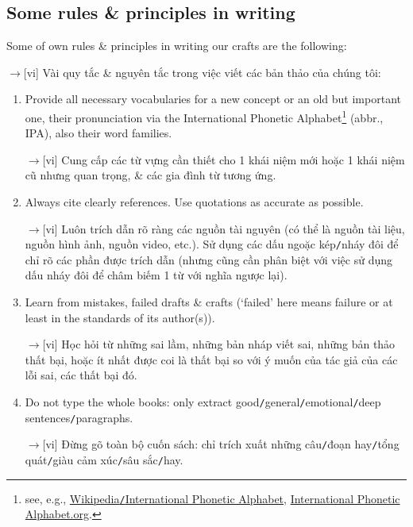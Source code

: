 \documentclass[12pt,twoside]{book}
\begin{document}
\subsection{Some rules \& principles in writing}
Some of own rules \& principles in writing our crafts are the following:

{\sf[en]$\to$[vi]} Vài quy tắc \& nguyên tắc trong việc viết các bản thảo của chúng tôi:
\begin{enumerate}
	\item Provide all necessary vocabularies for a new concept or an old but important one, their pronunciation via the International Phonetic Alphabet\footnote{see, e.g., \href{https://en.wikipedia.org/wiki/International_Phonetic_Alphabet}{Wikipedia{\tt/}International Phonetic Alphabet}, \href{https://www.internationalphoneticalphabet.org/}{International Phonetic Alphabet.org}.} (abbr., IPA), also their word families.
	
	{\sf[en]$\to$[vi]} Cung cấp các từ vựng cần thiết cho 1 khái niệm mới hoặc 1 khái niệm cũ nhưng quan trọng, \& các gia đình từ tương ứng.
	\item Always cite clearly references. Use quotations as accurate as possible.
	
	{\sf[en]$\to$[vi]} Luôn trích dẫn rõ ràng các nguồn tài nguyên (có thể là nguồn tài liệu, nguồn hình ảnh, nguồn video, etc.). Sử dụng các dấu ngoặc kép{\tt/}nháy đôi để chỉ rõ các phần được trích dẫn (nhưng cũng cần phân biệt với việc sử dụng dấu nháy đôi để châm biếm 1 từ với nghĩa ngược lại).
	\item Learn from mistakes, failed drafts \& crafts (`failed' here means failure or at least in the standards of its author(s)).
	
	{\sf[en]$\to$[vi]} Học hỏi từ những sai lầm, những bản nháp viết sai, những bản thảo thất bại, hoặc ít nhất được coi là thất bại so với ý muốn của tác giả của các lỗi sai, các thất bại đó.
	\item Do not type the whole books: only extract good{\tt/}general{\tt/}emotional{\tt/}deep sentences{\tt/}paragraphs.
	
	{\sf[en]$\to$[vi]} Đừng gõ toàn bộ cuốn sách: chỉ trích xuất những câu{\tt/}đoạn hay{\tt/}tổng quát{\tt/}giàu cảm xúc{\tt/}sâu sắc{\tt/}hay.
\end{enumerate}
\end{document}
